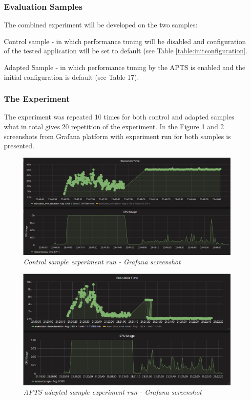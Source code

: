 \documentclass[12pt,a4paper]{article}
\let\tempone\itemize
\let\temptwo\enditemize
\renewenvironment{itemize}{\tempone\addtolength{\itemsep}{-0.4\baselineskip}}{\temptwo}
\begin{document}
\subsubsection{Evaluation Samples} 

The combined experiment will be developed on the two samples:
\begin{itemize}
\item Control sample - in which performance tuning will be disabled and configuration of the tested application will be set to default (see Table \ref{table:initconfiguration}. 
\item Adapted Sample - in which performance tuning by the APTS is enabled and the initial
configuration is default (see Table 17). 
\end{itemize}

\subsubsection{The Experiment} 

The experiment was repeated 10 times for both control and adapted samples what in total gives 20 repetition of the experiment. In the Figure \ref{figure:combined:screen:control} and \ref{figure:combined:screen:adapted} screenshots from Grafana platform with experiment run for both samples is presented.

\begin{figure}[!htb]
\centering
\includegraphics[width=1\textwidth]{combinedCtrl}
\caption{\textit{Control sample experiment run - Grafana screenshot}} \label{figure:combined:screen:control}
\end{figure}
\begin{figure}[!htb]
\centering
\includegraphics[width=1\textwidth]{combinedEval}
\caption{\textit{APTS adapted sample experiment run - Grafana screenshot}} \label{figure:combined:screen:adapted}
\end{figure}
\end{document}
